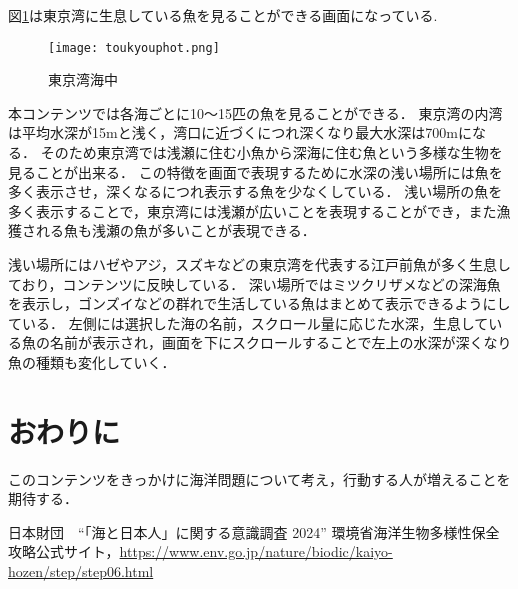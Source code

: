 \documentclass[twocolumn,a4j,10pt]{ltjsarticle}
\begin{document}
図\ref{fig:東京}は東京湾に生息している魚を見ることができる画面になっている.
\begin{figure}[h]
\begin{center}
 \texttt{[image: toukyouphot.png]}
\end{center}
 \caption{東京湾海中}
 \label{fig:東京}
\end{figure}
\par
本コンテンツでは各海ごとに10〜15匹の魚を見ることができる．
東京湾の内湾は平均水深が15mと浅く，湾口に近づくにつれ深くなり最大水深は700mになる．
そのため東京湾では浅瀬に住む小魚から深海に住む魚という多様な生物を見ることが出来る．
この特徴を画面で表現するために水深の浅い場所には魚を多く表示させ，深くなるにつれ表示する魚を少なくしている．
浅い場所の魚を多く表示することで，東京湾には浅瀬が広いことを表現することができ，また漁獲される魚も浅瀬の魚が多いことが表現できる．\par
浅い場所にはハゼやアジ，スズキなどの東京湾を代表する江戸前魚が多く生息しており，コンテンツに反映している．
深い場所ではミツクリザメなどの深海魚を表示し，ゴンズイなどの群れで生活している魚はまとめて表示できるようにしている．
左側には選択した海の名前，スクロール量に応じた水深，生息している魚の名前が表示され，画面を下にスクロールすることで左上の水深が深くなり魚の種類も変化していく．



\section{おわりに}
\label{sec:description3}
このコンテンツをきっかけに海洋問題について考え，行動する人が増えることを期待する．

\begin{thebibliography}{99}
日本財団　“「海と日本人」に関する意識調査 2024”
環境省海洋生物多様性保全攻略公式サイト，\url{https://www.env.go.jp/nature/biodic/kaiyo-hozen/step/step06.html}
\end{thebibliography}
\end{document}
